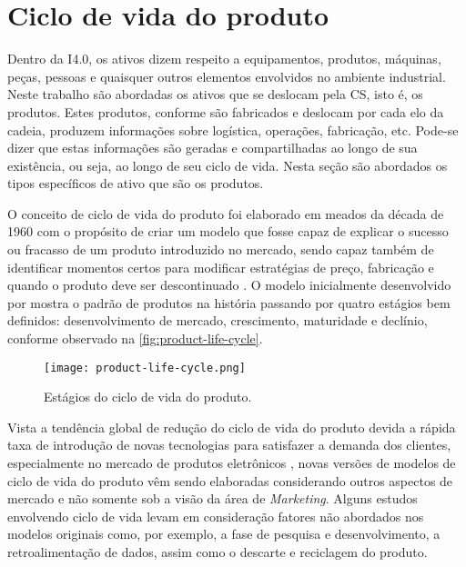 \section{Ciclo de vida do produto}
\label{sec:ciclo-de-vida}

Dentro da I4.0, os ativos dizem respeito a equipamentos, produtos, máquinas, peças, pessoas e quaisquer outros elementos envolvidos no ambiente industrial. Neste trabalho são abordadas os ativos que se deslocam pela CS, isto é, os produtos. Estes produtos, conforme são fabricados e deslocam por cada elo da cadeia, produzem informações sobre logística, operações, fabricação, etc. Pode-se dizer que estas informações são geradas e compartilhadas ao longo de sua existência, ou seja, ao longo de seu ciclo de vida. Nesta seção são abordados os tipos específicos de ativo que são os produtos.


O conceito de ciclo de vida do produto foi elaborado em meados da década de 1960 com o propósito de criar um modelo que fosse capaz de explicar o sucesso ou fracasso de um produto introduzido no mercado, sendo capaz também de identificar momentos certos para modificar estratégias de preço, fabricação e quando o produto deve ser descontinuado \cite{cao2012lifecycle}. O modelo inicialmente desenvolvido por  mostra o padrão de produtos na história passando por quatro estágios bem definidos: desenvolvimento de mercado, crescimento, maturidade e declínio, conforme observado na \autoref{fig:product-life-cycle}.

\begin{figure}[htb]
	\centering
	\texttt{[image: product-life-cycle.png]}
	\caption{Estágios do ciclo de vida do produto.}
	\label{fig:product-life-cycle}
\end{figure}

Vista a tendência global de redução do ciclo de vida do produto devida a rápida taxa de introdução de novas tecnologias para satisfazer a demanda dos clientes, especialmente no mercado de produtos eletrônicos \cite{trappey2008lifecycle}, novas versões de modelos de ciclo de vida do produto vêm sendo elaboradas considerando outros aspectos de mercado e não somente sob a visão da área de \textit{Marketing}. Alguns estudos \cite{cao2012lifecycle} envolvendo ciclo de vida levam em consideração fatores não abordados nos modelos originais como, por exemplo, a fase de pesquisa e desenvolvimento, a retroalimentação de dados, assim como o descarte e reciclagem do produto.

